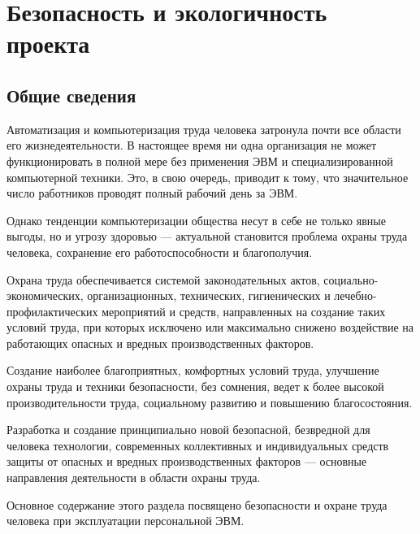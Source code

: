 \section{Безопасность и экологичность проекта}

\subsection*{Общие сведения}

Автоматизация и компьютеризация труда человека затронула почти все области его жизнедеятельности.
В настоящее время ни одна организация не может функционировать в полной мере без применения ЭВМ и специализированной компьютерной техники.
Это, в свою очередь, приводит к тому, что значительное число работников проводят полный рабочий день за ЭВМ.

Однако тенденции компьютеризации общества несут в себе не только явные выгоды, но и угрозу здоровью --- актуальной становится проблема охраны труда человека, сохранение его работоспособности и благополучия.

Охрана труда обеспечивается системой законодательных актов, социально-экономических, организационных, технических, гигиенических и лечебно-профилактических мероприятий и средств, направленных на создание таких условий труда, при которых исключено или максимально снижено воздействие на работающих опасных и вредных производственных факторов.

Создание наиболее благоприятных, комфортных условий труда, улучшение охраны труда и техники безопасности, без сомнения, ведет к более высокой производительности труда, социальному развитию и повышению благосостояния.

Разработка и создание принципиально новой безопасной, безвредной для человека технологии, современных коллективных и индивидуальных средств защиты от опасных и вредных производственных факторов --- основные направления деятельности в области охраны труда.

Основное содержание этого раздела посвящено безопасности и охране труда человека при эксплуатации персональной ЭВМ.

